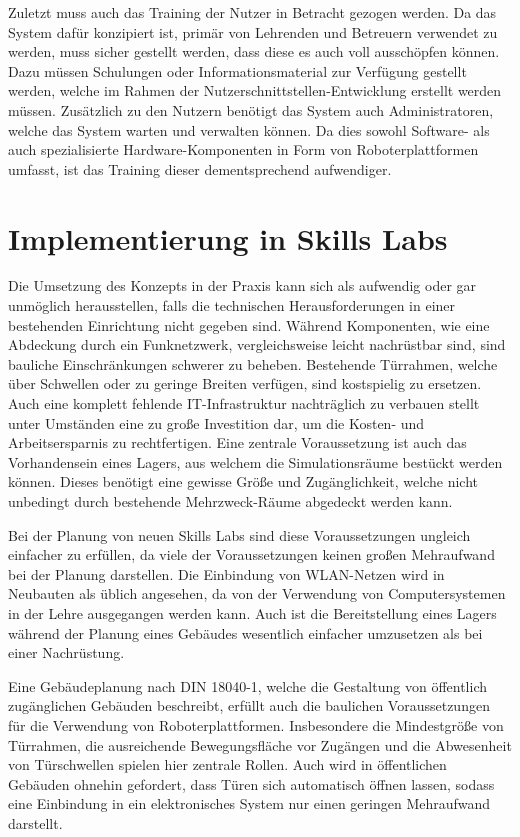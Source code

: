 Zuletzt muss auch das Training der Nutzer in Betracht gezogen werden. Da das System dafür konzipiert ist, primär von Lehrenden und Betreuern verwendet zu werden, muss sicher gestellt werden, dass diese es auch voll ausschöpfen können. Dazu müssen Schulungen oder Informationsmaterial zur Verfügung gestellt werden, welche im Rahmen der Nutzerschnittstellen-Entwicklung erstellt werden müssen. Zusätzlich zu den Nutzern benötigt das System auch Administratoren, welche das System warten und verwalten können. Da dies sowohl Software- als auch spezialisierte Hardware-Komponenten in Form von Roboterplattformen umfasst, ist das Training dieser dementsprechend aufwendiger.


\section{Implementierung in Skills Labs}

Die Umsetzung des Konzepts in der Praxis kann sich als aufwendig oder gar unmöglich herausstellen, falls die technischen Herausforderungen in einer bestehenden Einrichtung nicht gegeben sind. Während Komponenten, wie eine Abdeckung durch ein Funknetzwerk, vergleichsweise leicht nachrüstbar sind, sind bauliche Einschränkungen schwerer zu beheben. Bestehende Türrahmen, welche über Schwellen oder zu geringe Breiten verfügen, sind kostspielig zu ersetzen. Auch eine komplett fehlende IT-Infrastruktur nachträglich zu verbauen stellt unter Umständen eine zu große Investition dar, um die Kosten- und Arbeitsersparnis zu rechtfertigen. Eine zentrale Voraussetzung ist auch das Vorhandensein eines Lagers, aus welchem die Simulationsräume bestückt werden können. Dieses benötigt eine gewisse Größe und Zugänglichkeit, welche nicht unbedingt durch bestehende Mehrzweck-Räume abgedeckt werden kann.

Bei der Planung von neuen Skills Labs sind diese Voraussetzungen ungleich einfacher zu erfüllen, da viele der Voraussetzungen keinen großen Mehraufwand bei der Planung darstellen. Die Einbindung von WLAN-Netzen wird in Neubauten als üblich angesehen, da von der Verwendung von Computersystemen in der Lehre ausgegangen werden kann. Auch ist die Bereitstellung eines Lagers während der Planung eines Gebäudes wesentlich einfacher umzusetzen als bei einer Nachrüstung.

Eine Gebäudeplanung nach DIN 18040-1, welche die Gestaltung von öffentlich zugänglichen Gebäuden beschreibt, erfüllt auch die baulichen Voraussetzungen für die Verwendung von Roboterplattformen. Insbesondere die Mindestgröße von Türrahmen, die ausreichende Bewegungsfläche vor Zugängen und die Abwesenheit von Türschwellen spielen hier zentrale Rollen. Auch wird in öffentlichen Gebäuden ohnehin gefordert, dass Türen sich automatisch öffnen lassen, sodass eine Einbindung in ein elektronisches System nur einen geringen Mehraufwand darstellt.

